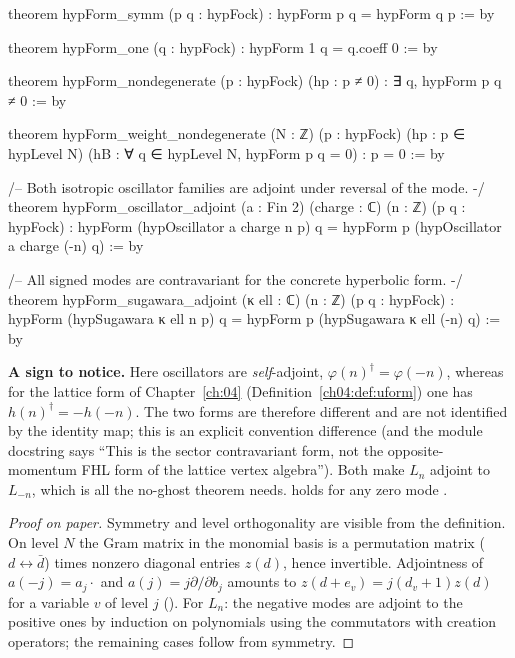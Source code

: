 \begin{leancode}
theorem hypForm_symm (p q : hypFock) : hypForm p q = hypForm q p := by

theorem hypForm_one (q : hypFock) : hypForm 1 q = q.coeff 0 := by

theorem hypForm_nondegenerate (p : hypFock) (hp : p ≠ 0) : ∃ q, hypForm p q ≠ 0 := by

theorem hypForm_weight_nondegenerate (N : ℤ) (p : hypFock) (hp : p ∈ hypLevel N)
    (hB : ∀ q ∈ hypLevel N, hypForm p q = 0) : p = 0 := by

/-- Both isotropic oscillator families are adjoint under reversal of the mode. -/
theorem hypForm_oscillator_adjoint (a : Fin 2) (charge : ℂ) (n : ℤ) (p q : hypFock) :
    hypForm (hypOscillator a charge n p) q =
      hypForm p (hypOscillator a charge (-n) q) := by

/-- All signed modes are contravariant for the concrete hyperbolic form. -/
theorem hypForm_sugawara_adjoint (κ ell : ℂ) (n : ℤ) (p q : hypFock) :
    hypForm (hypSugawara κ ell n p) q = hypForm p (hypSugawara κ ell (-n) q) := by
\end{leancode}

\begin{dictionary}
\textbf{A sign to notice.} Here oscillators are \emph{self}-adjoint, $\varphi(n)^\dagger=\varphi(-n)$, whereas for the lattice form
of Chapter~\ref{ch:04} (Definition~\ref{ch04:def:uform}) one has $h(n)^\dagger=-h(-n)$.  The two forms are therefore
different and are not identified by the identity map; this is an
explicit convention difference (and the module docstring says ``This is the sector contravariant form, not the
opposite-momentum FHL form of the lattice vertex algebra'').  Both make $L_n$ adjoint to $L_{-n}$, which is all
the no-ghost theorem needs.   holds for any zero mode .
\end{dictionary}

\begin{proof}[Proof on paper]
Symmetry and level orthogonality are visible from the definition.  On level $N$ the Gram matrix in the
monomial basis is a permutation matrix ($d\leftrightarrow\bar d$) times nonzero diagonal entries $z(d)$, hence
invertible.  Adjointness of $a(-j)=a_j\cdot$ and $a(j)=j\partial/\partial b_j$ amounts to $z(d+e_v)=j(d_v+1)z(d)$ for a
variable $v$ of level $j$ ().  For $L_n$: the negative modes are adjoint to the
positive ones by induction on polynomials using the commutators with creation operators; the remaining cases
follow from symmetry.
\end{proof}


